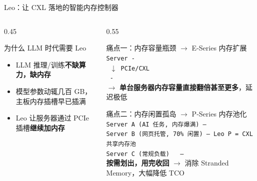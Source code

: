 \documentclass[aspectratio=169, 8pt, UTF8]{ctexbeamer}
\begin{document}
\begin{frame}{Leo：让 CXL 落地的智能内存控制器}
\begin{columns}[T]
\begin{column}{0.45\textwidth}
      \vspace{6pt}
      \begin{exampleblock}{为什么 LLM 时代需要 Leo}
        \begin{itemize}
          \item LLM 推理/训练\textbf{不缺算力，缺内存}
          \item 模型参数动辄几百 GB，主板内存插槽早已插满
          \item Leo 让服务器通过 PCIe 插槽\textbf{继续加内存}
        \end{itemize}
      \end{exampleblock}
    \end{column}
    \begin{column}{0.55\textwidth}
      \begin{alertblock}{痛点一：内存容量瓶颈 $\to$ E-Series 内存扩展}
        \vspace{2pt}
        \texttt{%
        \quad Server\ \textbullet\!\!-\!\!\textbullet\ \\[2pt]
        \quad \ $\downarrow$ PCIe/CXL\\[2pt]
        \quad {}\ \textbullet\!\!-\!\!\textbullet\ \\[6pt]
        }
        $\to$ \textbf{单台服务器内存容量直接翻倍甚至更多}，延迟极低
      \end{alertblock}

      \vspace{4pt}

      \begin{block}{痛点二：内存闲置孤岛 $\to$ P-Series 内存池化}
        \vspace{2pt}
        \texttt{%
        \quad Server A (AI 任务, 内存爆满) ---\qquad\ \ \,\\[2pt]
        \quad Server B (网页托管, 70\% 闲置) ---\ Leo P\ =\ CXL 共享内存池\\[2pt]
        \quad Server C (常规负载)\qquad\ \ \ ---\qquad\ \ \,\\[6pt]
        }
        \textbf{按需划出，用完收回} $\to$ 消除 Stranded Memory，大幅降低 TCO
      \end{block}
    \end{column}
  \end{columns}
\end{frame}
\end{document}

